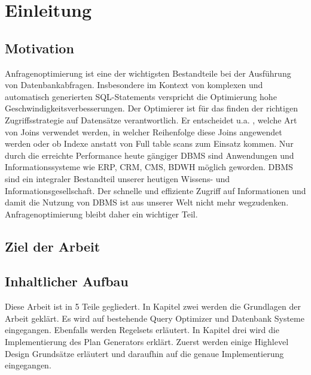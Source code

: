 \section{Einleitung}

\subsection{Motivation}
Anfragenoptimierung ist eine der wichtigsten Bestandteile bei der Ausführung von Datenbankabfragen. Insbesondere im Kontext von komplexen und automatisch generierten SQL-Statements verspricht die Optimierung hohe Geschwindigkeitsverbesserungen. Der Optimierer ist für das finden der richtigen Zugriffsstrategie auf Datensätze verantwortlich. Er entscheidet u.a. , welche Art von Joins verwendet werden, in welcher Reihenfolge diese Joins angewendet werden oder ob Indexe anstatt von Full table scans zum Einsatz kommen. Nur durch die erreichte Performance heute gängiger \ac{DBMS} sind Anwendungen und Informationssysteme wie \ac{ERP}, \ac{CRM}, \ac{CMS}, \ac{BDWH} möglich geworden. \ac{DBMS} sind ein integraler Bestandteil unserer heutigen Wissens- und Informationsgesellschaft. Der schnelle und effiziente Zugriff auf Informationen und damit die Nutzung von \ac{DBMS} ist aus unserer Welt nicht mehr wegzudenken. Anfragenoptimierung bleibt daher ein wichtiger Teil.




\subsection{Ziel der Arbeit}

\subsection{Inhaltlicher Aufbau}

Diese Arbeit ist in 5 Teile gegliedert. In Kapitel zwei werden die Grundlagen der Arbeit geklärt. Es wird auf bestehende Query Optimizer und Datenbank Systeme eingegangen. Ebenfalls werden Regelsets erläutert. In Kapitel drei wird die Implementierung des Plan Generators erklärt. Zuerst werden einige Highlevel Design Grundsätze erläutert und daraufhin auf die genaue Implementierung eingegangen.